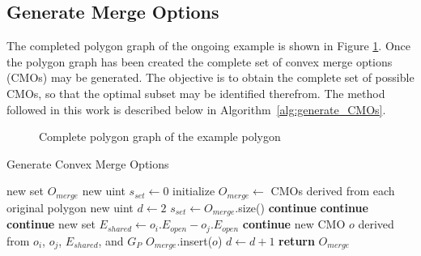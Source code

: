 \subsection{Generate Merge Options}
The completed polygon graph of the ongoing example is shown in Figure \ref{fig:pg_complete}.
Once the polygon graph has been created the complete set of convex merge options (CMOs) may be generated.
The objective is to obtain the complete set of possible CMOs, so that the optimal subset may be identified therefrom.
The method followed in this work is described below in Algorithm~\ref{alg:generate_CMOs}.

\begin{figure}[htb]
	\centering
\caption{Complete polygon graph of the example polygon}
	\label{fig:pg_complete}
\end{figure}

\begin{algorithm}[!htb]
\caption{Generate Convex Merge Options}\label{alg:generate_CMOs}
\begin{algorithmic}[1]
	\State new set $O_{merge}$ 
	\State new uint $s_{set} \leftarrow 0$ 
	\State initialize $O_{merge} \leftarrow$ CMOs derived from each original polygon
	\State new uint $d \leftarrow 2$ 
		\State $s_{set} \leftarrow O_{merge}$.size()
					\State \textbf{continue}
				\EndIf
					\State \textbf{continue}
				\EndIf
					\State \textbf{continue}
				\EndIf
				\State new set $E_{shared} \leftarrow o_i$.$E_{open} - o_j$.$E_{open}$
					\State \textbf{continue}
				\EndIf
				\State new CMO $o$ derived from $o_i$, $o_j$, $E_{shared}$, and $G_P$
				\State $O_{merge}$.insert($o$)
			\EndFor
		\EndFor
		\State $d \leftarrow d + 1$
	\EndWhile
	\State \textbf{return} $O_{merge}$
\EndFunction
\end{algorithmic}
\end{algorithm}

